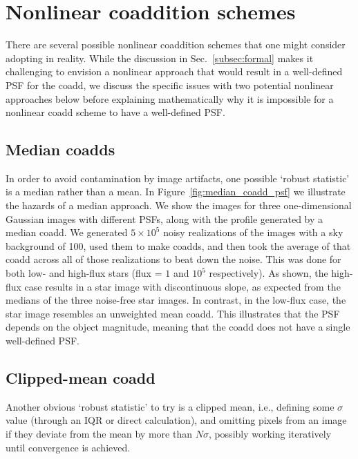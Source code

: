 \documentclass[modern]{style_and_logos/lsstdescnote}
\begin{document}
\section{Nonlinear coaddition schemes}\label{sec:nonlin}

There are several possible nonlinear coaddition schemes that one might consider adopting in reality.  While the discussion in Sec.~\ref{subsec:formal} makes it challenging to envision a nonlinear approach that would result in a well-defined PSF for the coadd, we discuss the specific issues with two potential nonlinear approaches below before explaining mathematically why it is impossible for a nonlinear coadd scheme to have a well-defined PSF.

\subsection{Median coadds}

In order to avoid contamination by image artifacts, one possible `robust statistic' is a median rather than a mean.  In Figure~\ref{fig:median_coadd_psf} we illustrate the hazards of a median approach.
We show the images for three one-dimensional Gaussian images with different PSFs, along with the profile generated by a median coadd.  We generated $5\times 10^5$ noisy realizations of the images with a sky background of 100,  used them to make coadds, and then took the average of that coadd across all of those realizations to beat down the noise.  This was done for both low- and high-flux stars (flux = $1$ and $10^5$ respectively).
As shown, the high-flux case results in a star image with discontinuous slope, as expected from the medians of the three noise-free star images.  In contrast, in the low-flux case, the star image resembles an unweighted mean coadd. 
This illustrates that the PSF depends on the object magnitude, meaning that the coadd does not have a single well-defined PSF.

\subsection{Clipped-mean coadd}

Another obvious `robust statistic' to try is a clipped mean, i.e., defining some $\sigma$ value (through an IQR or direct calculation), and omitting pixels from an image if they deviate from the mean by more than $N\sigma$, possibly working iteratively until convergence is achieved.
\end{document}
